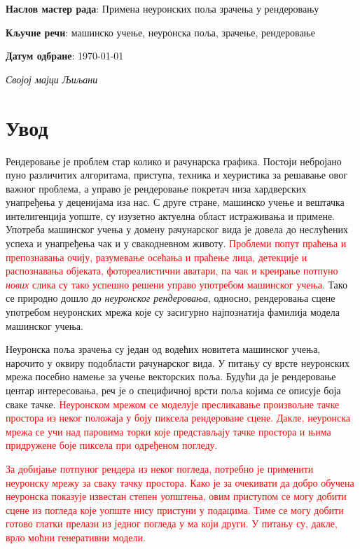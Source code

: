 \documentclass[12pt, a4paper, twoside]{book}
\numberwithin{equation}{chapter}
\numberwithin{theorem}{section}
\numberwithin{definition}{section}
\numberwithin{definitionChapter}{chapter}
\begin{document}
\noindent \textbf{Наслов мастер рада}: Примена неуронских поља зрачења у рендеровању

\noindent \textbf{Кључне речи}: машинско учење, неуронска поља, зрачење, рендеровање

\noindent \textbf{Датум одбране}: \today
\hspace{0pt}
\vfill

\newpage
\thispagestyle{empty}
\textit{Својој мајци Љиљани}

\listoffigures
\listoftables
\tableofcontents

\chapter{Увод}
Рендеровање је проблем стар колико и рачунарска графика. Постоји небројано пуно различитих
алгоритама, приступа, техника и хеуристика за решавање овог важног проблема, а управо је
рендеровање покретач низа хардверских унапређења у деценијама иза нас. С друге стране,
машинско учење и вештачка интелигенција уопште, су изузетно актуелна област истраживања и примене.
Употреба машинског учења у домену рачунарског вида је довела до неслућених успеха и унапређења
чак и у свакодневном животу. \textcolor{red}{Проблеми попут праћења и препознавања очију, разумевање
осећања и праћење лица, детекције и распознавања објеката, фотореалистични аватари, па чак и креирање потпуно
\textit{нових} слика су тако успешно решени управо употребом машинског учења.} Тако се природно дошло до \textit{неуронског рендеровања},
односно, рендеровања сцене употребом неуронских мрежа које су засигурно најпознатија фамилија модела машинског учења.

Неуронска поља зрачења су један од водећих новитета машинског учења, нарочито у оквиру
подобласти рачунарског вида. У питању су врсте неуронских мрежа посебно намење за учење векторских поља.
Будући да је рендеровање центар интересовања, реч је о специфичној врсти поља којима се описује боја
сваке тачке. \textcolor{red}{Неуронском мрежом се моделује пресликавање произвољне тачке простора из неког положаја у
боју пиксела рендероване сцене. Дакле, неуронска мрежа се учи над паровима торки које представљају тачке
простора и њима придружене боје пиксела при одређеном погледу.}

\textcolor{red}{За добијање потпуног рендера из неког погледа, потребно је применити
неуронску мрежу за сваку тачку простора. Како је за очекивати да добро обучена неуронска показује
известан степен уопштења, овим приступом се могу добити сцене из погледа које уопште нису пристуни у подацима.
Тиме се могу добити готово глатки прелази из једног погледа у ма који други. У питању су, дакле, врло моћни
генеративни модели.}
\end{document}
